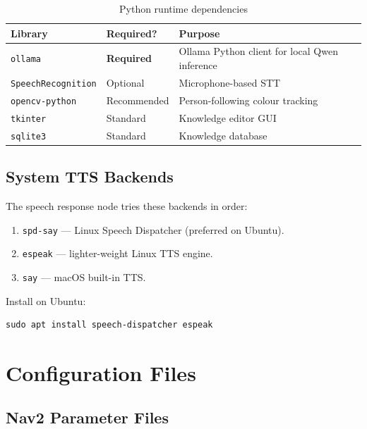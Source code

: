 \documentclass[12pt,a4paper]{report}
\begin{document}
\begin{table}[H]
  \centering
  \caption{Python runtime dependencies}
  \begin{tabularx}{\linewidth}{L{4cm} L{2.5cm} X}
    \toprule
    \textbf{Library} & \textbf{Required?} & \textbf{Purpose} \\
    \midrule
    \texttt{ollama}           & \textbf{Required} & Ollama Python client for local Qwen inference \\
    \texttt{SpeechRecognition}& Optional  & Microphone-based STT \\
    \texttt{opencv-python}    & Recommended & Person-following colour tracking \\
    \texttt{tkinter}          & Standard  & Knowledge editor GUI \\
    \texttt{sqlite3}          & Standard  & Knowledge database \\
    \bottomrule
  \end{tabularx}
\end{table}

\section{System TTS Backends}

The speech response node tries these backends in order:

\begin{enumerate}[leftmargin=2em]
  \item \texttt{spd-say} — Linux Speech Dispatcher (preferred on Ubuntu).
  \item \texttt{espeak} — lighter-weight Linux TTS engine.
  \item \texttt{say} — macOS built-in TTS.
\end{enumerate}

Install on Ubuntu:
\begin{lstlisting}[style=bashstyle]
sudo apt install speech-dispatcher espeak
\end{lstlisting}

\chapter{Configuration Files}
\label{ch:config}

\section{Nav2 Parameter Files}
\end{document}
